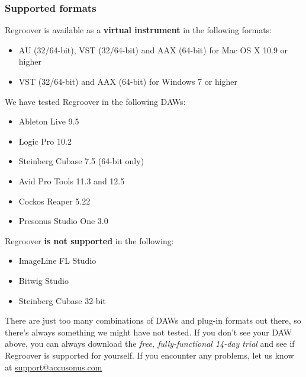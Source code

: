 \documentclass[12pt]{article}
\begin{document}
\subsubsection*{Supported formats}
Regroover is available as a \textbf{virtual instrument} in the following formats:
\begin{itemize}
\item AU (32/64-bit), VST (32/64-bit) and AAX (64-bit) for Mac OS X 10.9 or higher
\item VST (32/64-bit) and AAX (64-bit) for Windows 7 or higher
\end{itemize}
We have tested Regroover in the following DAWs:
\begin{itemize}
\item Ableton Live 9.5
\item Logic Pro 10.2 
\item Steinberg Cubase 7.5 (64-bit only)
\item Avid Pro Tools 11.3 and 12.5
\item Cockos Reaper 5.22
\item Presonus Studio One 3.0
\end{itemize}
Regroover \textbf{is not supported} in the following:
\begin{itemize}
\item ImageLine FL Studio
\item Bitwig Studio
\item Steinberg Cubase 32-bit
\end{itemize}
\begin{mdframed}[style = warning]
There are just too many combinations of DAWs and plug-in formats out there, so there's always something we might have not tested. If you don't see your DAW above, you can always download the \textit{free, fully-functional 14-day trial} and see if Regroover is supported for yourself. If you encounter any problems, let us know at \url{support@accusonus.com}
\end{mdframed}
\end{document}
